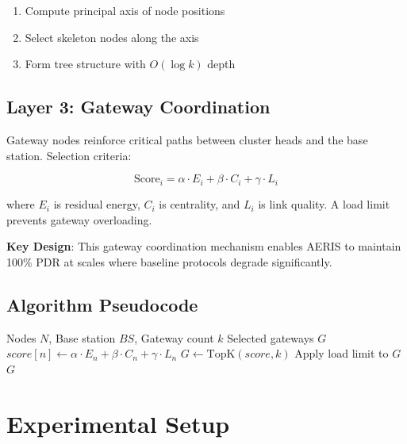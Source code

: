 \documentclass[twocolumn]{article}
\begin{document}
\begin{enumerate}
    \item Compute principal axis of node positions
    \item Select skeleton nodes along the axis
    \item Form tree structure with $O(\log k)$ depth
\end{enumerate}

\subsection{Layer 3: Gateway Coordination}

Gateway nodes reinforce critical paths between cluster heads and the
base station. Selection criteria:

\begin{equation}
\text{Score}_i = \alpha \cdot E_i + \beta \cdot C_i + \gamma \cdot L_i
\end{equation}

where $E_i$ is residual energy, $C_i$ is centrality, and $L_i$ is link
quality. A load limit prevents gateway overloading.

\textbf{Key Design}: This gateway coordination mechanism enables AERIS to
maintain 100\% PDR at scales where baseline protocols degrade significantly.

\subsection{Algorithm Pseudocode}

\begin{algorithm}
\caption{AERIS Gateway Selection}
\begin{algorithmic}[1]
\REQUIRE Nodes $N$, Base station $BS$, Gateway count $k$
\ENSURE Selected gateways $G$
    \STATE $score[n] \gets \alpha \cdot E_n + \beta \cdot C_n + \gamma \cdot L_n$
\ENDFOR
\STATE $G \gets \text{TopK}(score, k)$
\STATE Apply load limit to $G$
\RETURN $G$
\end{algorithmic}
\end{algorithm}

\section{Experimental Setup}
\label{sec:setup}
\end{document}
